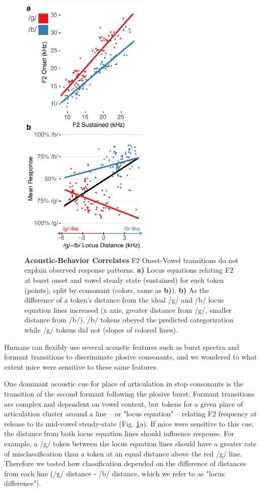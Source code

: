 \documentclass[preprint, NumberedRefs]{JASAnew}\usepackage[]{graphicx}\usepackage[]{color}
\begin{document}
\begin{figure}[!t]
\includegraphics[width=2.5in]{../figures/Figure5.pdf}
\caption{\textbf{Acoustic-Behavior Correlates} F2 Onset-Vowel transitions do not explain observed response patterns. \textbf{a)} Locus equations relating F2 at burst onset and vowel steady state (sustained) for each token (points), split by consonant (colors, same as \textbf{b)}). \textbf{b)} As the difference of a token's distance from the ideal /g/ and /b/ locus equation lines increased (x axis, greater distance from /g/, smaller distance from /b/), /b/ tokens obeyed the predicted categorization while /g/ tokens did not (slopes of colored lines). }
\label{acoustic}
\end{figure}

Humans can flexibly use several acoustic features such as burst spectra and formant transitions to discriminate plosive consonants, and we wondered to what extent mice were sensitive to these same features.

One dominant acoustic cue for place of articulation in stop consonants is the transition of the second formant following the plosive burst\cite{Wright2004,Sussman1998,Lindblom2012}. Formant transitions are complex and dependent on vowel context, but tokens for a given place of articulation cluster around a line -- or "locus equation" -- relating F2 frequency at release to its mid-vowel steady-state\cite{Sussman1998,Lindblom2012} (Fig. \ref{acoustic}a).  If mice were sensitive to this cue, the distance from both locus equation lines should influence response. For example, a /g/ token between the locus equation lines should have a greater rate of misclassification than a token at an equal distance above the red /g/ line. Therefore we tested how classification depended on the difference of distances from each line (/g/ distance - /b/ distance, which we refer to as "locus difference").
\end{document}
